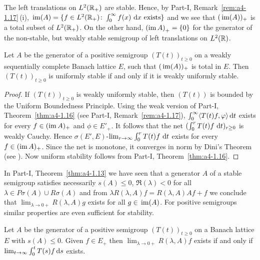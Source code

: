 The left translations on $L^{2}(\mathbb{R}_{+})$ are stable.
Hence, by Part-I, Remark~\ref{rem:a4-1.17}\,(i), $\mathop{}\mathrm{im}(A) = \{f \in L^{2}(\mathbb{R}_{+}) \colon \int_{0}^{\infty} f(x) \, \mathop{}\!\mathrm{d}{x} \text{ exists}\}$ and we see that $(\mathop{}\mathrm{im}(A))_{+}$ is a total subset of\/ $L^{2}(\mathbb{R}_{+})$.
On the other hand, $\mleft(\image{A}\mright)_{+} = \{0\}$ for the generator of the non-stable, but weakly stable semigroup of left translations on $L^{2}(\mathbb{R})$.
\begin{proposition}\label{prop:c4-1.7}
%
Let $A$ be the generator of a positive semigroup $(T(t))_{t\geq 0}$ on a weakly sequentially complete Banach lattice $E$, such that $(\mathop{}\mathrm{im}(A))_{+}$ is total in $E$.
Then $(T(t))_{t\geq 0}$ is uniformly stable if and only if it is weakly uniformly stable.
\end{proposition}
\begin{proof}
If\/ $(T(t))_{t\geq 0}$ is weakly uniformly stable, then $(T(t))$ is bounded by the Uniform Boundedness Principle.
Using the weak version of Part-I, Theorem~\ref{thm:a4-1.16} (see Part-I, Remark~\ref{rem:a4-1.17}), 
$\int_{0}^{\infty} \langle T(t)f,\phi \rangle \dt$ exists for every $f \in (\mathop{}\!\mathrm{im}\,{A})_{+}$ and $\phi \in E'_{+}$.
It follows that the net $(\int_{0}^{r} T(t)f \, \dt)_{r\geq 0}$ is weakly Cauchy.
Hence $\sigma(E',E)$-$\lim_{r \to \infty} \int_{0}^{r} T(t)f \, \mathop{}\!\mathrm{d}{t}$ exists for every $f \in (\mathop{}\!\mathrm{im}\,{A})_{+}$.
Since the net is monotone, it converges in norm by Dini's Theorem (see \textcite [II. Theorem~5.9]{schaefer:1974}).
Now uniform stability follows from Part-I, Theorem~\ref{thm:a4-1.16}.
\end{proof}
In Part-I, Theorem~\ref{thm:a4-1.13} we have seen that a generator $A$ of a stable semigroup satisfies necessarily $s(A) \leq 0$, $\Re(\lambda) < 0$ for all $\lambda \in P{\sigma}(A) \cup R{\sigma}(A)$ and from $\lambda R(\lambda,A)f = R(\lambda,A)Af + f$ we conclude that $\lim_{\lambda \to 0+} R(\lambda,A)g$ exists for all $g \in \mathop{}\mathrm{im}(A)$. 
For positive semigroups similar properties are even sufficient for stability.
\begin{lemma}\label{lem:c4-1.8}
%
Let $A$ be the generator of a positive semigroup $(T(t))_{t\geq 0}$ on a Banach lattice $E$ with $s(A) \leq 0$.
Given $f \in E_{+}$ then $\lim_{\lambda \to 0+} R(\lambda,A)f$ exists if and only if\/ $\lim_{t \to \infty} \int_{0}^{t} T(s)f \mathop{}\!\mathrm{d}{s}$ exists.
\end{lemma}
